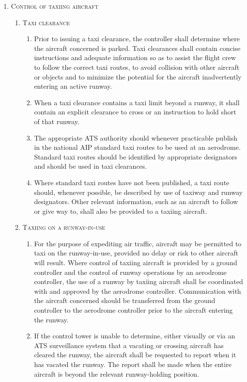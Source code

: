 \documentclass[../main.tex]{subfiles}
\begin{document}
    \begin{enumerate}[itemsep=0.2cm]\centering
        \item \textsc{Control of taxiing aircraft}
        \begin{enumerate}[labelindent=0pt,itemsep=0.2cm]
            \item \textsc{Taxi clearance}
            \begin{enumerate}
                \item Prior to issuing a taxi clearance, the controller shall determine where the aircraft concerned is parked. Taxi clearances shall contain concise instructions and adequate information so as to assist the flight crew to follow the correct taxi routes, to avoid collision with other aircraft or objects and to minimize the potential for the aircraft inadvertently entering an active runway.
                \item When a taxi clearance contains a taxi limit beyond a runway, it shall contain an explicit clearance to cross or an instruction to hold short of that runway.
                \item The appropriate ATS authority should whenever practicable publish in the national AIP standard taxi routes to be used at an aerodrome. Standard taxi routes should be identified by appropriate designators and should be used in taxi clearances.
                \item Where standard taxi routes have not been published, a taxi route should, whenever possible, be described by use of taxiway and runway designators. Other relevant information, such as an aircraft to follow or give way to, shall also be provided to a taxiing aircraft.
            \end{enumerate}

            \item \textsc{Taxiing on a runway-in-use}
            \begin{enumerate}
                \item For the purpose of expediting air traffic, aircraft may be permitted to taxi on the runway-in-use, provided no delay or risk to other aircraft will result. Where control of taxiing aircraft is provided by a ground controller and the control of runway operations by an aerodrome controller, the use of a runway by taxiing aircraft shall be coordinated with and approved by the aerodrome controller. Communication with the aircraft concerned should be transferred from the ground controller to the aerodrome controller prior to the aircraft entering the runway.
                \item \label{7.6.3.1.2.2} If the control tower is unable to determine, either visually or via an ATS surveillance system that a vacating or crossing aircraft has cleared the runway, the aircraft shall be requested to report when it has vacated the runway. The report shall be made when the entire aircraft is beyond the relevant runway-holding position.
            \end{enumerate}


\end{enumerate}
\end{enumerate}
\end{document}
